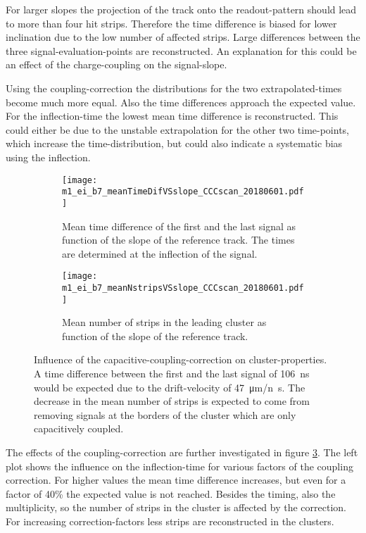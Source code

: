 \documentclass[
twoside,            %
BCOR1.4cm,          %
10pt,               %
headings=normal,    %
headsepline,        %
clearplainpage,		%
final,              %
div=14,
open=right,
bibliography=toc
]{scrreprt}
\begin{document}
For larger slopes the projection of the track onto the readout-pattern should lead to more than four hit strips.
Therefore the time difference is biased for lower inclination due to the low number of affected strips.
Large differences between the three signal-evaluation-points are reconstructed.
An explanation for this could be an effect of the charge-coupling on the signal-slope.

Using the coupling-correction the distributions for the two extrapolated-times become much more equal.
Also the time differences approach the expected value.
For the inflection-time the lowest mean time difference is reconstructed.
This could either be due to the unstable extrapolation for the other two time-points, which increase the time-distribution, but could also indicate a systematic bias using the inflection.

\begin{figure}[!h]
	\begin{subfigure}[b]{0.48\textwidth}
		\centering
		\texttt{[image: m1\_ei\_b7\_meanTimeDifVSslope\_CCCscan\_20180601.pdf]}
		\caption{
			Mean time difference of the first and the last signal as function of the slope of the reference track.
			The times are determined at the inflection of the signal.
		}
		\label{timeDifFirstNlastVSslope_mean_CCCscan} 
	\end{subfigure}
	\hfill
	\begin{subfigure}[b]{0.48\textwidth}
		\centering
		\texttt{[image: m1\_ei\_b7\_meanNstripsVSslope\_CCCscan\_20180601.pdf]}
		\caption{
			Mean number of strips in the leading cluster as function of the slope of the reference track.
		}
		\label{nStripsVSslope_mean_CCCscan} 
	\end{subfigure}
	\vspace{-2mm}
	\caption{
		Influence of the capacitive-coupling-correction on cluster-properties.
		A time difference between the first and the last signal of \SI{106}{ns} would be expected due to the drift-velocity of \SI{47}{\micro m/n s}.
		The decrease in the mean number of strips is expected to come from removing signals at the borders of the cluster which are only capacitively coupled. 
	}
	\label{couplingCorrection}
\end{figure}

The effects of the coupling-correction are further investigated in figure \ref{couplingCorrection}.
The left plot shows the influence on the inflection-time for various factors of the coupling correction.
For higher values the mean time difference increases, but even for a factor of 40\% the expected value is not reached.
Besides the timing, also the multiplicity, so the number of strips in the cluster is affected by the correction.
For increasing correction-factors less strips are reconstructed in the clusters.
\end{document}
